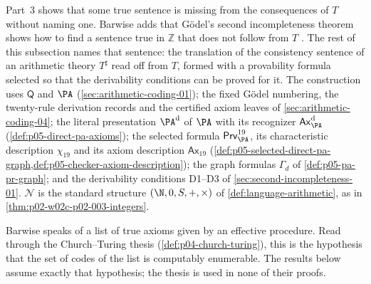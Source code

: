 Part~3 shows that some true sentence is missing from the consequences of
\(T\) without naming one.  Barwise adds that G\"odel's second
incompleteness theorem shows how to find a sentence true in \(\mathbb Z\)
that does not follow from \(T\)
\cite[ch.~A.1, \S2, p.~16]{Barwise1977FirstOrder}.  The rest of this
subsection names that sentence: the translation of the consistency sentence
of an arithmetic theory \(T^{\sharp}\) read off from \(T\), formed with a
provability formula selected so that the derivability conditions can be
proved for it.  The construction uses \(\mathsf Q\) and \(\PA\)
(\cref{sec:arithmetic-coding-01}); the fixed G\"odel numbering, the
twenty-rule derivation records and the certified axiom leaves of
\cref{sec:arithmetic-coding-04}; the literal presentation \(\PA^{\rm d}\)
of \(\PA\) with its recognizer \(\mathsf{Ax}^{\rm d}_{\PA}\)
(\cref{def:p05-direct-pa-axioms}); the selected formula
\(\mathsf{Prv}^{19}_{\PA}\), its characteristic description
\(\chi_{19}\) and its axiom description \(\mathsf{Ax}_{19}\)
(\cref{def:p05-selected-direct-pa-graph,def:p05-checker-axiom-description});
the graph formulas \(\Gamma_d\) of \cref{def:p05-pa-pr-graph}; and the
derivability conditions D1--D3 of \cref{sec:second-incompleteness-01}.
\(\mathcal N\) is the standard structure \((\N,0,S,+,\times)\) of
\cref{def:language-arithmetic}, as in
\cref{thm:p02-w02c-p02-003-integers}.

Barwise speaks of a list of true axioms given by an effective procedure.
Read through the Church--Turing thesis (\cref{def:p04-church-turing}), this
is the hypothesis that the set of codes of the list is computably
enumerable.  The results below assume exactly that hypothesis; the thesis is
used in none of their proofs.

